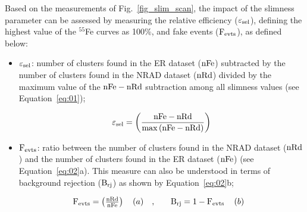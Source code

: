 \documentclass[a4paper,11pt]{article}
\begin{document}

Based on the measurements of Fig.~\ref{fig_slim_scan}, the impact of the slimness parameter can be assessed by measuring the relative efficiency ($\rm \varepsilon_{sel}$), defining the highest value of the $^{55}$Fe curves as 100\%, and fake events ($\rm F_{evts}$), as defined below:


\begin{itemize}
    \item $\rm \varepsilon_{sel}$: number of clusters found in the ER dataset ($\rm nFe$) subtracted by the number of clusters found in the NRAD dataset ($\rm nRd$) divided by the maximum value of the $\rm nFe-nRd$ subtraction among all slimness values (see Equation~\ref{eq:01});
    
    \begin{equation}
       {\rm \varepsilon_{sel} = \left( {\frac{{nFe - nRd}}{{\max \left( {nFe - nRd} \right)}}} \right)}
       \label{eq:01}
    \end{equation}

    
    \item $\rm F_{evts}$: ratio between the number of clusters found in the NRAD dataset ($\rm nRd$) and the number of clusters found in the ER dataset ($\rm  nFe$) (see Equation~\ref{eq:02}a). This measure can also be understood in terms of background rejection ($\rm B_{rj}$) as shown by Equation~\ref{eq:02}b;
    
    
\end{itemize}
\begin{equation}
    \begin{array}{*{20}{c}}
   \begin{array}{*{20}{c}}
   {\rm F_{evts} = \left( {\frac{{nRd}}{{nFe}}} \right)}  \\
\end{array} ~~(a) & {, ~~~} & {\rm B_{rj} = 1 - F_{evts} }  \\
\end{array} ~~(b)
\label{eq:02}
\end{equation}
\end{document}
